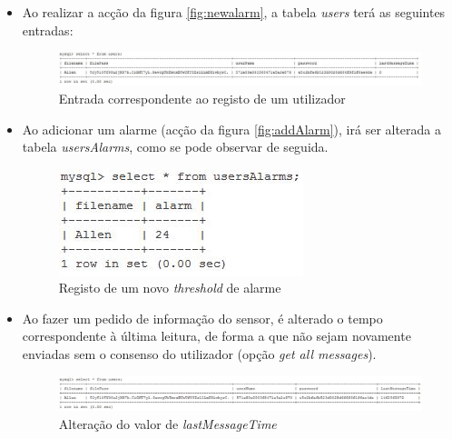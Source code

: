 \documentclass[a4paper]{article}
\begin{document}
\begin{itemize}
\item Ao realizar a acção da figura \ref{fig:newalarm}, a tabela \textit{users} terá as seguintes entradas:

\begin{figure}[H]
\includegraphics[width=\linewidth]{logfirst.png}
  \caption{Entrada correspondente ao registo de um utilizador}\label{fig:db-first}
\end{figure}

\item Ao adicionar um alarme (acção da figura \ref{fig:addAlarm}), irá ser alterada a tabela \textit{usersAlarms}, como se pode observar de seguida.

\begin{figure}[H]
\centering
\includegraphics[scale=0.5]{newalarmm.png}
  \caption{Registo de um novo \textit{threshold} de alarme}\label{fig:newalarmm}
\end{figure}

\item Ao fazer um pedido de informação do sensor, é alterado o tempo correspondente à última leitura, de forma a que não sejam novamente enviadas sem o consenso do utilizador (opção \textit{get all messages}).

\begin{figure}[H]
\centering
\includegraphics[width=\linewidth]{newtime.png}
  \caption{Alteração do valor de \textit{lastMessageTime}}\label{fig:newtime}
\end{figure}
\end{itemize}

\end{document}
